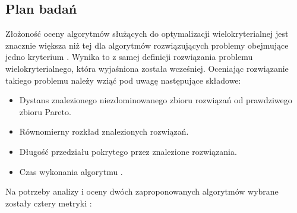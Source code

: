 \documentclass[twoside]{iisthesis}
\begin{document}
\subsection{Plan badań}
Złożoność oceny algorytmów służących do optymalizacji wielokryterialnej jest znacznie większa niż tej dla algorytmów rozwiązujących problemy obejmujące jedno kryterium \cite{comparison_deb}. Wynika to z samej definicji rozwiązania problemu wielokryterialnego, która wyjaśniona została wcześniej. Oceniając rozwiązanie takiego problemu należy wziąć pod uwagę następujące składowe:\\
\begin{itemize}
	\item Dystans znalezionego niezdominowanego zbioru rozwiązań od prawdziwego zbioru Pareto.
	\item Równomierny rozkład znalezionych rozwiązań.
	\item Długość przedziału pokrytego przez znalezione rozwiązania.
	\item Czas wykonania algorytmu \cite{comparison_2}.\\
\end{itemize}
Na potrzeby analizy i oceny dwóch zaproponowanych algorytmów wybrane zostały cztery metryki \cite{comparison_deb}\cite{comparison_2}:
\end{document}
